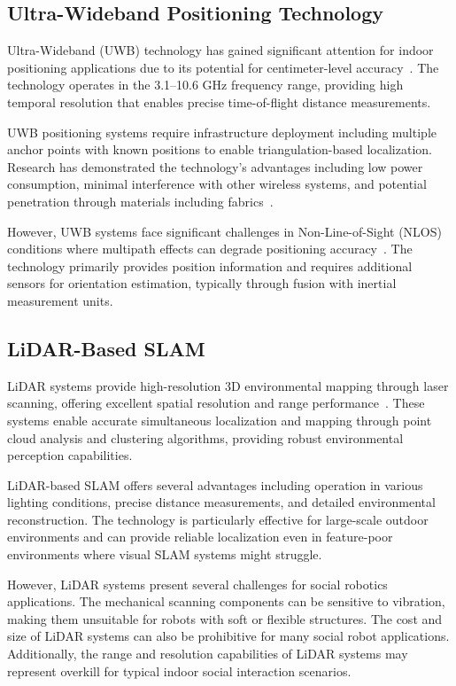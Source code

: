 \subsection{Ultra-Wideband Positioning Technology}
Ultra-Wideband (UWB) technology has gained significant attention for indoor positioning applications due to its potential for centimeter-level accuracy~\cite{gezici2005localization}. The technology operates in the 3.1--10.6 GHz frequency range, providing high temporal resolution that enables precise time-of-flight distance measurements.

UWB positioning systems require infrastructure deployment including multiple anchor points with known positions to enable triangulation-based localization. Research has demonstrated the technology's advantages including low power consumption, minimal interference with other wireless systems, and potential penetration through materials including fabrics~\cite{rpo2019uwb}.

However, UWB systems face significant challenges in Non-Line-of-Sight (NLOS) conditions where multipath effects can degrade positioning accuracy~\cite{luo2020uwb}. The technology primarily provides position information and requires additional sensors for orientation estimation, typically through fusion with inertial measurement units.

\subsection{LiDAR-Based SLAM}
LiDAR systems provide high-resolution 3D environmental mapping through laser scanning, offering excellent spatial resolution and range performance~\cite{yan2019lidar}. These systems enable accurate simultaneous localization and mapping through point cloud analysis and clustering algorithms, providing robust environmental perception capabilities.

LiDAR-based SLAM offers several advantages including operation in various lighting conditions, precise distance measurements, and detailed environmental reconstruction. The technology is particularly effective for large-scale outdoor environments and can provide reliable localization even in feature-poor environments where visual SLAM systems might struggle.

However, LiDAR systems present several challenges for social robotics applications. The mechanical scanning components can be sensitive to vibration, making them unsuitable for robots with soft or flexible structures. The cost and size of LiDAR systems can also be prohibitive for many social robot applications. Additionally, the range and resolution capabilities of LiDAR systems may represent overkill for typical indoor social interaction scenarios.

